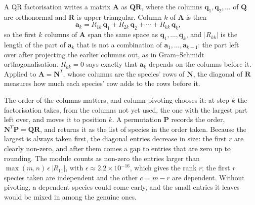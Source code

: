 \documentclass[11pt,a4paper,openany]{report}
\begin{document}
{{A QR factorisation writes a matrix $\mathbf{A}$ as $\mathbf{Q}\mathbf{R}$,
where the columns $\mathbf{q}_1, \mathbf{q}_2, \ldots$ of $\mathbf{Q}$ are orthonormal and
$\mathbf{R}$ is upper triangular. Column $k$ of $\mathbf{A}$ is then
\[
  \mathbf{a}_k = R_{1k}\, \mathbf{q}_1 + R_{2k}\, \mathbf{q}_2 + \cdots + R_{kk}\, \mathbf{q}_k ,
\]
so the first $k$ columns of $\mathbf{A}$ span the same space as
$\mathbf{q}_1, \ldots, \mathbf{q}_k$, and $|R_{kk}|$ is the length of the part of $\mathbf{a}_k$ that
is not a combination of $\mathbf{a}_1, \ldots, \mathbf{a}_{k-1}$: the part left over after
projecting the earlier columns out, as in Gram--Schmidt orthogonalisation.
$R_{kk} = 0$ says exactly that $\mathbf{a}_k$ depends on the columns before it.
Applied to $\mathbf{A} = \mathbf{N}^T$, whose columns are the species' rows
of $\mathbf{N}$, the diagonal of $\mathbf{R}$ measures how much each
species' row adds to the rows before it.

The order of the columns matters, and column pivoting chooses it: at step
$k$ the factorisation takes, from the columns not yet used, the one with the
largest part left over, and moves it to position $k$. A permutation
$\mathbf{P}$ records the order, $\mathbf{N}^T \mathbf{P} = \mathbf{Q}
\mathbf{R}$, and  returns it as the list  of
species in the order taken. Because the largest is always taken first, the
diagonal entries decrease in size: the first $r$ are clearly non-zero, and
after them comes a gap to entries that are zero up to rounding. The module
counts as non-zero the entries larger than $\max(m, n)\,\epsilon\,
|R_{11}|$, with $\epsilon \approx 2.2 \times 10^{-16}$, which gives the
rank $r$; the first $r$ species taken are independent and the other $c = m -
r$ are dependent. Without pivoting, a dependent species could come early, and
the small entries it leaves would be mixed in among the genuine ones.

}}
\end{document}

